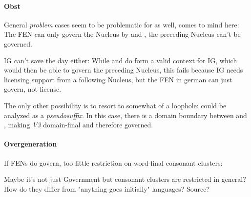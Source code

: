 
\paragraph{Obst}
General \emph{problem} cases seem to be problematic for
\CVCV as well,  %
comes to mind here:
The \gls{FEN} can only govern the Nucleus  by
\ti{[s]} and \ti{[t]}, the preceding Nucleus can't be governed.

\begin{structure}
  \wordstart
  \emptyV
  \emptyV
  \fen
\end{structure}

\gls{IG} can't save the day either:
While \ti{[s]} and \ti{[t]} do form a valid context for \gls{IG},
which would then be able to govern the preceding Nucleus,
this fails because \gls{IG} needs licensing support from a following
Nucleus, but the \gls{FEN} in german can just govern, not license.

The only other possibility is to resort to somewhat of a loophole:
\ti{[st]} could be analyzed as a \emph{pseudosuffix}.
In this case, there is a domain boundary between \ti{[p]}
and \ti{[s]}, making \emph{V3} %
domain-final and therefore governed.


\paragraph{Overgeneration}
If \glspl{FEN} do govern, too little restriction on word-final consonant
clusters:

\ti{*[Sa:kf]}
\begin{structure}
  \wordstart
  \emptyV
  \fen
\end{structure}

Maybe it's not just Government but consonant clusters are restricted
in general? How do they differ from "anything goes initially" languages?
Source?